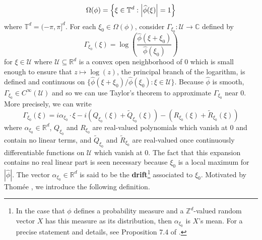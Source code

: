 \documentclass[11pt]{article}
\theoremstyle{remark}
\begin{document}
\begin{equation*}
    \Omega(\phi)=\left\{\xi\in \mathbb{T}^d:\abs{\widehat{\phi}(\xi)}=1\right\}
\end{equation*}
where $\mathbb{T}^d=(-\pi,\pi]^d$. For each $\xi_0\in \Omega(\phi)$, consider $\Gamma_{\xi_0}:\mathcal{U}\to\mathbb{C}$ defined by
\begin{equation*}\Gamma_{\xi_0}(\xi)=\log\left(\frac{\widehat{\phi}(\xi+\xi_0)}{\widehat{\phi}(\xi_0)}\right)
\end{equation*}
for $\xi\in \mathcal{U}$ where $\mathcal{U}\subseteq\mathbb{R}^d$ is a convex open neighborhood of $0$ which is small enough to ensure that $z\mapsto\log(z)$, the principal branch of the logarithm, is defined and continuous on $\{\widehat{\phi}(\xi+\xi_0)/\widehat{\phi}(\xi_0):\xi\in\mathcal{U}\}$. Because $\widehat{\phi}$ is smooth, $\Gamma_{\xi_0}\in C^{\infty}(\mathcal{U})$ and so we can use Taylor's theorem to approximate $\Gamma_{\xi_0}$ near $0$. More precisely, we can write
\begin{equation}\label{eq:GammaExpansion}
    \Gamma_{\xi_0}(\xi)=i\alpha_{\xi_0}\cdot\xi -i\left(Q_{\xi_0}(\xi)+\widetilde{Q}_{\xi_0}(\xi)\right)-\left(R_{\xi_0}(\xi)+\widetilde{R}_{\xi_0}(\xi)\right)
\end{equation}
where $\alpha_{\xi_0}\in\mathbb{R}^d$, $Q_{\xi_0}$ and $R_{\xi_0}$ are real-valued polynomials which vanish at $0$ and contain no linear terms, and $\widetilde{Q}_{\xi_0}$ and $\widetilde{R}_{\xi_0}$ are real-valued once continuously differentiable functions on $\mathcal{U}$ which vanish at $0$. The fact that this expansion contains no real linear part is seen necessary because $\xi_0$ is a local maximum for $|\widehat{\phi}|$. The vector $\alpha_{\xi_0}\in\mathbb{R}^d$ is said to be the \textbf{drift}\footnote{In the case that $\phi$ defines a probability measure and a $\mathbb{Z}^d$-valued random vector $X$ has this measure as its distribution, then $\alpha_{\xi_0}$ is $X$'s mean. For a precise statement and details, see Proposition 7.4 of \cite{randles_convolution_2017}.} associated to $\xi_0$. Motivated by Thom\'{e}e \cite{thomee_stability_1965}, we introduce the following definition. 
\end{document}
